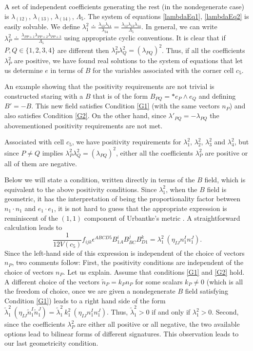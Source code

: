 \documentclass{article}
\begin{document}
A set of independent coefficients generating the rest (in the nondegenerate case) is $\lambda_{(12)}$, $\lambda_{(13)}$, $\lambda_{(14)}$, $\Lambda_5$. 
The system of equations \eqref{lambdaEq1}, \eqref{lambdaEq2} is easily solvable. We define 
$\lambda_1^2 \doteq \frac{\lambda_{13} \lambda_{14}}{\lambda_{34}} = \frac{\lambda_{12} \lambda_{13} \lambda_{14}}{\Lambda_5}$. In general, we can write 
$\lambda_P^2 \doteq \frac{\lambda_{P P+1} \lambda_{P P+2} \lambda_{P P+3}}{\Lambda_5}$ using appropriate cyclic conventions. 
It is clear that if $P, Q \in \{ 1,2,3,4 \}$ are different then 
$\lambda_P^2 \lambda_Q^2 = (\lambda_{PQ})^2$. Thus, if all the coefficients $\lambda_P^2$ are positive, we have found real solutions to the system of equations that let us determine $e$ in terms of $B$ for the variables associated with the corner cell $c_{5}$. 

An example showing that the positivity requirements are not trivial is constructed staring with a $B$ that is of the form $B_{PQ} = \ast e_P \wedge e_Q$ and defining $B' = -B$. This new field satisfies Condition \ref{G1} (with the same vectors $n_P$) and also satisfies Condition \ref{G2}. 
On the other hand, since $\lambda'_{PQ}= - \lambda_{PQ}$ the abovementioned positivity requirements are not met. 

Associated with cell $c_{5}$, we have positivity requirements for $\lambda_1^2$, $\lambda_2^2$, $\lambda_3^2$ and $\lambda_4^2$, but since $P\neq Q$ implies $\lambda_P^2 \lambda_Q^2 = (\lambda_{PQ})^2$, either all the coefficients $\lambda_P^2$ are positive or all of them are negative. 

Below we will state a condition, written directly in terms of the $B$ field, which is equivalent to the above positivity conditions. 
Since $\lambda_1^2$, when the $B$ field is geometric, it has the interpretation of being the proportionality factor between $n_1 \cdot n_1$ and $e_1 \cdot e_1$, it is not hard to guess that the appropriate expression is reminiscent of the $(1, 1)$ component of Urbantke's metric \cite{Urbantke}. 
A straightforward calculation leads to 
\[
	\frac{1}{12 V(c_{5})}f_{ijk} \epsilon^{ABCD5} B^i_{1A} B^j_{BC} B^k_{D1} = \lambda_1^2 \ (\eta_{IJ} n_1^I  n_1^J).
\]
Since the left-hand side of this expression is independent of the choice of vectors $n_P$, two comments follow: 
First, the positivity conditions are independent of the choice of vectors $n_P$. Let us explain. 
Assume that conditions \ref{G1} and \ref{G2} hold. 
A different choice of the vectors $\tilde{n}_P = k_P n_P$ for some scalars $k_P \neq 0$ (which is all the freedom of choice, once we are given a nondegenerate $B$ field satisfying Condition \ref{G1}) leads to a right hand side of the form $\tilde{\lambda}_1^2 \ (\eta_{IJ} \tilde{n}_1^I  \tilde{n}_1^J)= \tilde{\lambda}_1^2 \ k_1^2 \ (\eta_{IJ} n_1^I  n_1^J)$. Thus, $\tilde{\lambda}_1^2 > 0$ if and only if $\lambda_1^2 > 0$. 
Second, since the coefficients $\lambda_P^2$ are either all positive or all negative, the two available options lead to bilinear forms of different signatures. This observation leads to our last geometricity condition. 
\end{document}

